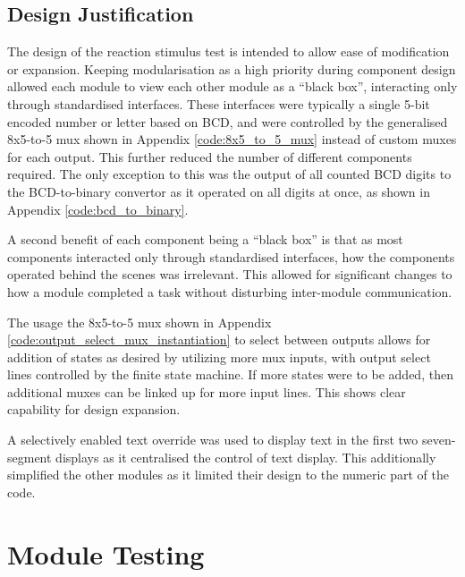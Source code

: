 \documentclass[11pt]{article}
\begin{document}
\subsection{Design Justification}
The design of the reaction stimulus test is intended to allow ease of modification or expansion. Keeping modularisation as a high priority during component design allowed each module to view each other module as a ``black box'', interacting only through standardised interfaces. These interfaces were typically a single 5-bit encoded number or letter based on BCD, and were controlled by the generalised 8x5-to-5 mux shown in Appendix \ref{code:8x5_to_5_mux} instead of custom muxes for each output. This further reduced the number of different components required. The only exception to this was the output of all counted BCD digits to the BCD-to-binary convertor as it operated on all digits at once, as shown in Appendix \ref{code:bcd_to_binary}.

A second benefit of each component being a ``black box'' is that as most components interacted only through standardised interfaces, how the components operated behind the scenes was irrelevant. This allowed for significant changes to how a module completed a task without disturbing inter-module communication.

The usage the 8x5-to-5 mux shown in Appendix \ref{code:output_select_mux_instantiation} to select between outputs allows for addition of states as desired by utilizing more mux inputs, with output select lines controlled by the finite state machine. If more states were to be added, then additional muxes can be linked up for more input lines. This shows clear capability for design expansion.

A selectively enabled text override was used to display text in the first two seven-segment displays as it centralised the control of text display. This additionally simplified the other modules as it limited their design to the numeric part of the code.


\newpage

\section{Module Testing}
\end{document}
